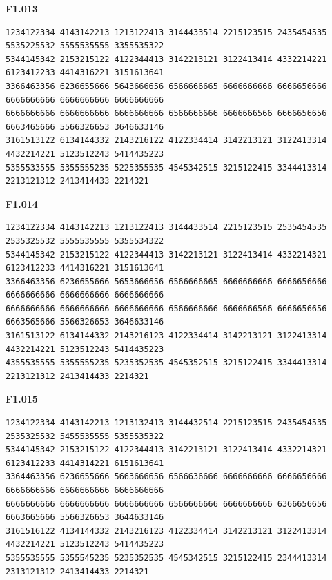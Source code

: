 \noindent\begin{minipage}{\linewidth}\textbf{F1.013}
\begin{lstlisting}
1234122334 4143142213 1213122413 3144433514 2215123515 2435454535 5535225532 5555535555 3355535322
5344145342 2153215122 4122344413 3142213121 3122413414 4332214221 6123412233 4414316221 3151613641
3366463356 6236655666 5643666656 6566666665 6666666666 6666656666 6666666666 6666666666 6666666666
6666666666 6666666666 6666666666 6566666666 6666666566 6666656656 6663465666 5566326653 3646633146
3161513122 6134144332 2143216122 4122334414 3142213121 3122413314 4432214221 5123512243 5414435223
5355533555 5355555235 5225355535 4545342515 3215122415 3344413314 2213121312 2413414433 2214321
\end{lstlisting}
\end{minipage}\par\smallskip

\noindent\begin{minipage}{\linewidth}\textbf{F1.014}
\begin{lstlisting}
1234122334 4143142213 1213122413 3144433514 2215123515 2535454535 2535325532 5555535555 5355534322
5344145342 2153215122 4122344413 3142213121 3122413414 4332214321 6123412233 4414316221 3151613641
3366463356 6236655666 5653666656 6566666665 6666666666 6666656666 6666666666 6666666666 6666666666
6666666666 6666666666 6666666666 6566666666 6666666566 6666656656 6663565666 5566326653 3646633146
3161513122 6134144332 2143216123 4122334414 3142213121 3122413314 4432214221 5123512243 5414435223
4355535555 5355555235 5235352535 4545352515 3215122415 3344413314 2213121312 2413414433 2214321
\end{lstlisting}
\end{minipage}\par\smallskip

\noindent\begin{minipage}{\linewidth}\textbf{F1.015}
\begin{lstlisting}
1234122334 4143142213 1213132413 3144432514 2215123515 2435454535 2535325532 5455535555 5355535322
5344145342 2153215122 4122344413 3142213121 3122413414 4332214321 6123412233 4414314221 6151613641
3364463356 6236655666 5663666656 6566636666 6666666666 6666656666 6666666666 6666666666 6666666666
6666666666 6666666666 6666666666 6566666666 6666666666 6366656656 6663665666 5566326653 3644633146
3161516122 4134144332 2143216123 4122334414 3142213121 3122413314 4432214221 5123512243 5414435223
5355535555 5355545235 5235352535 4545342515 3215122415 2344413314 2313121312 2413414433 2214321
\end{lstlisting}
\end{minipage}\par\smallskip

